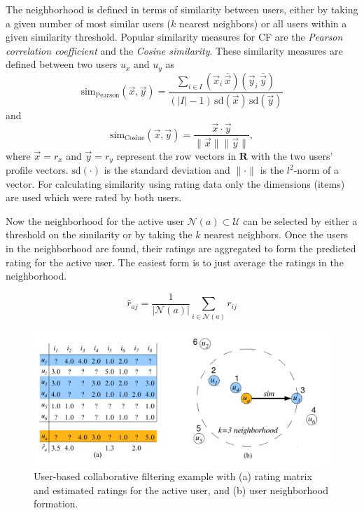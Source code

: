 \documentclass[nojss]{jss}
\newcommand{\set}[1]{\mathcal{#1}}
\newcommand{\mat}[1]{{\mathbf{#1}}}
\begin{document}
The neighborhood is defined in terms of similarity between users,
either by taking a given number of most similar users ($k$ nearest neighbors)
or all users within
a given similarity threshold.
Popular similarity measures for CF are
the \emph{Pearson correlation coefficient} and
the \emph{Cosine similarity}. These similarity measures are defined
between two users $u_x$ and $u_y$ as
\begin{equation}
\mathrm{sim_{Pearson}}(\vec{x},\vec{y}) =
	    \frac{\sum_{i \in I} (\vec{x}_i \, \bar{\vec{x}})(\vec{y}_i \, \bar{\vec{y}})}
		{(|I| -1) \, \mathrm{sd}(\vec{x}) \, \mathrm{sd}(\vec{y})}
\end{equation}
and
\begin{equation}
\mathrm{sim_{Cosine}}(\vec{x},\vec{y}) =
	    \frac{\vec{x}\cdot\vec{y}}
		    {\|\vec{x}\| \|\vec{y}\|},
\end{equation}
where
$\vec{x} = r_{x}$ and
$\vec{y} = r_{y}$ represent the
row vectors in $\mat{R}$ with the
two users' profile vectors.
$\mathrm{sd}(\cdot)$ is the standard deviation and
$\|\cdot\|$ is the $l^2$-norm of a vector.
For calculating similarity using rating data only the dimensions (items)
are used which were rated by both users.

Now the neighborhood for the active user $\set{N}(a) \subset \set{U}$
can be selected
by either a threshold on the similarity or by taking the
$k$ nearest neighbors.
Once the users in the neighborhood are found, their ratings are
aggregated to form the predicted rating for the active user.
The easiest form is to just average the ratings in the neighborhood.

\begin{equation}
\hat{r}_{aj}=\frac{1}{|\set{N}(a)|} \sum_{i\in\set{N}(a)} r_{ij}
\label{equ:aggregation1}
\end{equation}

\begin{figure}
\centerline{\includegraphics[width=13cm]{user-based}}
\caption{User-based collaborative filtering example with (a) rating matrix
and estimated ratings for the active user, and
(b) user neighborhood formation.
}
\label{fig:UBCF}
\end{figure}
\end{document}
